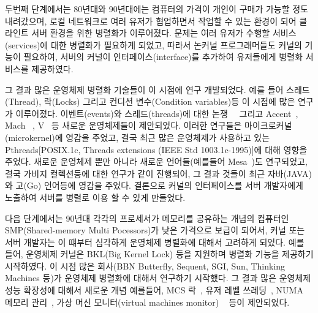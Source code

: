 두번째 단계에서는 80년대와 90년대에는 컴퓨터의 가격이 개인이 구매가 가능할 정도 내려갔으며,
 로컬 네트워크로 여러 유저가 
협업하면서 작업할 수 있는 환경이 되어 클라인트 서버 환경을 위한 병렬화가 이루어졌다.
문제는 여러 유저가 수행할 서비스(services)에 대한 병렬화가 필요하게 되었고, 
따라서 논커널 프로그래머들도 커널의 기능이 필요하여, 서버의 커널이 인터페이스(interface)를
 추가하여 유저들에게 병렬화 서비스를 제공하였다. 
 
그 결과 많은 운영체제 병렬화 기술들이 이 시점에 연구 개발되었다. 
예를 들어 스레드(Thread), 락(Locks) 그리고 컨디션 변수(Condition variables)등 이 시점에 많은 연구가 
이루어졌다.
이벤트(events)와 스레드(threads)에 대한 논쟁~\cite{Ous96}~\cite{vonBehren2003WEB}
그리고 Accent~\cite{Rashid1981ACO},
Mach~\cite{Accetta86mach} , V~\cite{Cheriton1983DVK} 등 새로운 운영체제들이 제안되었다. 
이러한 연구들은 마이크로커널(microkernel)에 영감을 주었고, 결국 최근 많은 운영체제가 사용하고 있는 
Pthreads[POSIX.1c, Threads extensions (IEEE Std 1003.1c-1995)]에 대해 영향을 주었다. 
새로운 운영체제 뿐만 아니라 새로운 언어들(예를들어 Mesa~\cite{Lampson1979EPM})도
 연구되었고, 결국 가비지 컬렉션등에 대한 연구가 같이 진행되어, 그 결과 것들이 최근 자바(JAVA)와 고(Go) 언어등에
 영감을 주었다.
결론으로 커널의 인터페이스를 서버 개발자에게 노출하여 서버를 병렬로 이용 할 수 있게 만들었다.

다음 단계에서는 90년대 각각의 프로세서가 메모리를 공유하는 개념의 컴퓨터인 SMP(Shared-memory Multi
Pocessors)가 낮은 가격으로 보급이 되어서, 커널 또는 서버 개발자는 이 떄부터 심각하게 운영체제 병렬화에 대해서 고려하게 되었다.
예를 들어, 운영체제 커널은 BKL(Big Kernel Lock) 등을 지원하며 병렬화 기능을 제공하기 시작하였다.
이 시점 많은 회사(BBN Butterfly, Sequent, SGI, Sun, Thinking Machines 등)가 운영체제 병렬화에 대해서 
연구하기 시작했다.
그 결과 많은 운영체제 성능 확장성에 대해서 새로운 개념 예를들어, 
MCS 락~\cite{MellorCrummey1991MCS}, 유저 레벨 쓰레딩~\cite{Marsh1991FUT},
 NUMA 메모리 관리~\cite{Bolosky1991NPR}, 가상 머신 모니터(virtual machines monitor)
~\cite{Bugnion1997DRC} 등이 제안되었다.  


